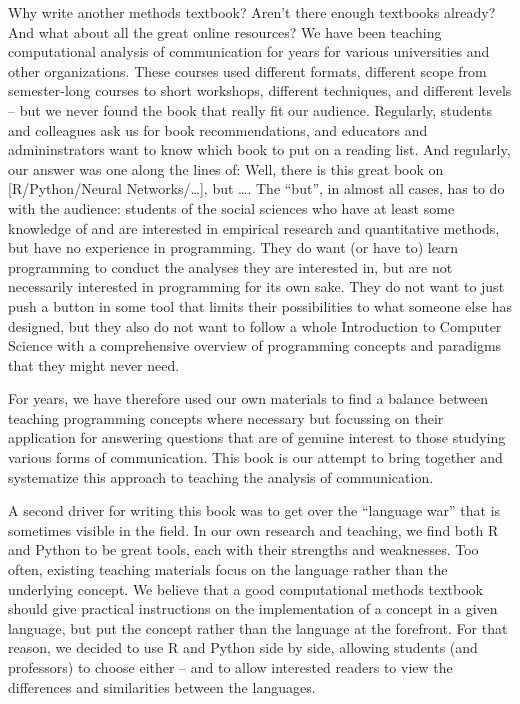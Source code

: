 Why write another methods textbook? Aren't there enough textbooks already? And what about all the great online resources?
We have been teaching computational analysis of communication for years for various universities and other organizations.
These courses used different formats, different scope from semester-long courses to short workshops, different techniques,
and different levels -- but we never found the book that really fit our audience.
Regularly, students and colleagues ask
us for book recommendations, and educators and admininstrators want to know which book to put on a reading list.
And regularly,
our answer was one along the lines of: Well, there is this great book on [R/Python/Neural Networks/\ldots], but \ldots.
The ``but'', in almost all cases, has to do with the audience: students of the social sciences who have at least some knowledge of and are
interested in empirical research and quantitative methods, but have no experience in programming. They do want (or have to)
learn programming to conduct the analyses they are interested in, but are not necessarily interested in programming for its own sake.
They do not want to just push a button in some tool that limits their possibilities to what someone else has designed, but they
also do not want to follow a whole Introduction to Computer Science with a comprehensive overview of programming concepts and paradigms
that they might never need.

For years, we have therefore used our own materials to find a balance between teaching programming concepts where necessary but
focussing on their application for answering questions that are of genuine interest to those studying various forms of communication.
This book is our attempt to bring together and systematize this approach to teaching the analysis of communication.

A second driver for writing this book was to get over the ``language war'' that is sometimes visible in the field. In our own research
and teaching, we find both R and Python to be great tools, each with their strengths and weaknesses. Too often, existing
teaching materials focus on the language rather than the underlying concept. We believe that a good computational methods textbook
should give practical instructions on the implementation of a concept in a given language, but put the concept rather than the language at the forefront.
For that reason, we decided to use R and Python side by side, allowing students (and professors) to choose either --
and to allow interested readers to view the differences and similarities between the languages.

